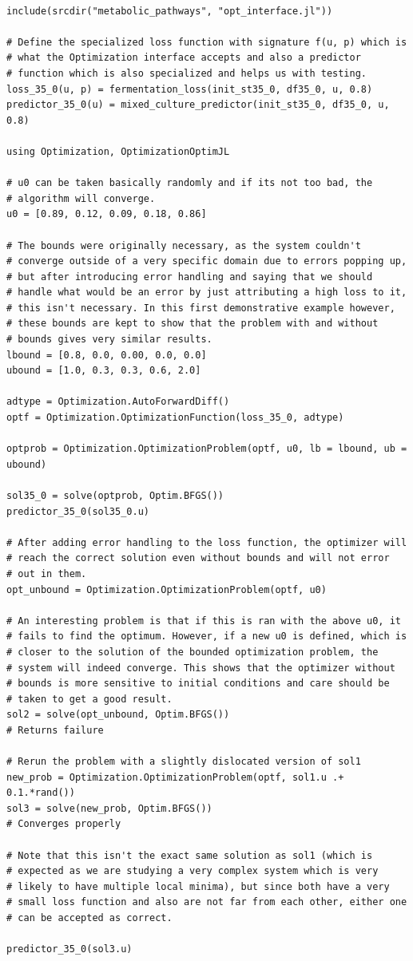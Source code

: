 \documentclass[11pt]{article}
\begin{document}
\begin{verbatim}

include(srcdir("metabolic_pathways", "opt_interface.jl"))

# Define the specialized loss function with signature f(u, p) which is
# what the Optimization interface accepts and also a predictor
# function which is also specialized and helps us with testing.
loss_35_0(u, p) = fermentation_loss(init_st35_0, df35_0, u, 0.8)
predictor_35_0(u) = mixed_culture_predictor(init_st35_0, df35_0, u, 0.8)

using Optimization, OptimizationOptimJL

# u0 can be taken basically randomly and if its not too bad, the
# algorithm will converge.
u0 = [0.89, 0.12, 0.09, 0.18, 0.86]

# The bounds were originally necessary, as the system couldn't
# converge outside of a very specific domain due to errors popping up,
# but after introducing error handling and saying that we should
# handle what would be an error by just attributing a high loss to it,
# this isn't necessary. In this first demonstrative example however,
# these bounds are kept to show that the problem with and without
# bounds gives very similar results.
lbound = [0.8, 0.0, 0.00, 0.0, 0.0]
ubound = [1.0, 0.3, 0.3, 0.6, 2.0]

adtype = Optimization.AutoForwardDiff()
optf = Optimization.OptimizationFunction(loss_35_0, adtype)

optprob = Optimization.OptimizationProblem(optf, u0, lb = lbound, ub = ubound)

sol35_0 = solve(optprob, Optim.BFGS())
predictor_35_0(sol35_0.u)

# After adding error handling to the loss function, the optimizer will
# reach the correct solution even without bounds and will not error
# out in them.
opt_unbound = Optimization.OptimizationProblem(optf, u0)

# An interesting problem is that if this is ran with the above u0, it
# fails to find the optimum. However, if a new u0 is defined, which is
# closer to the solution of the bounded optimization problem, the
# system will indeed converge. This shows that the optimizer without
# bounds is more sensitive to initial conditions and care should be
# taken to get a good result.
sol2 = solve(opt_unbound, Optim.BFGS())
# Returns failure

# Rerun the problem with a slightly dislocated version of sol1
new_prob = Optimization.OptimizationProblem(optf, sol1.u .+ 0.1.*rand())
sol3 = solve(new_prob, Optim.BFGS())
# Converges properly

# Note that this isn't the exact same solution as sol1 (which is
# expected as we are studying a very complex system which is very
# likely to have multiple local minima), but since both have a very
# small loss function and also are not far from each other, either one
# can be accepted as correct.

predictor_35_0(sol3.u)
\end{verbatim}
\end{document}
